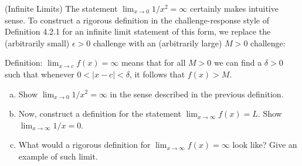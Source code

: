 (Infinite Limits) The statement $\lim_{x\rightarrow 0} 1/x^2 = \infty$ certainly makes intuitive sense.
To construct a rigorous definition in the challenge-response style of Definition 4.2.1 for an infinite limit statement
of this form, we replace the (arbitrarily small) $\epsilon > 0$ challenge with an (arbitrarily large) $M>0$ challenge:

Definition: $\lim_{x\rightarrow c} f(x) = \infty$ means that for all $M>0$ we can find a $\delta >0$
such that whenever $0 < |x-c| < \delta$, it follows that $f(x) > M$.

\begin{enumerate}[(a)]
\item Show $\lim_{x\rightarrow 0} 1/x^2 = \infty$ in the sense described in the previous definition.

\item Now, construct a definition for the statement $\lim_{x\rightarrow \infty} f(x) = L$. Show $\lim_{x\rightarrow \infty} 1/x =0$.

\item What would a rigorous definition for $\lim_{x\rightarrow \infty} f(x) = \infty$ look like?
Give an example of such limit.
\end{enumerate}